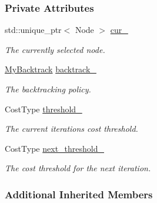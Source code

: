 \subsubsection*{Private Attributes}
\begin{DoxyCompactItemize}
\item 
std\+::unique\+\_\+ptr$<$ Node $>$ \hyperlink{structIdAstar_a31b0b5e1d6cd55096a2039ab572c8f8a}{cur\+\_\+}\hypertarget{structIdAstar_a31b0b5e1d6cd55096a2039ab572c8f8a}{}\label{structIdAstar_a31b0b5e1d6cd55096a2039ab572c8f8a}

\begin{DoxyCompactList}\small\item\em The currently selected node. \end{DoxyCompactList}\item 
\hyperlink{structIdAstar_a94823ee534c98478b29969d1a7f1c859}{My\+Backtrack} \hyperlink{structIdAstar_a51fc74d792b6e168dba6cbff3290dff5}{backtrack\+\_\+}\hypertarget{structIdAstar_a51fc74d792b6e168dba6cbff3290dff5}{}\label{structIdAstar_a51fc74d792b6e168dba6cbff3290dff5}

\begin{DoxyCompactList}\small\item\em The backtracking policy. \end{DoxyCompactList}\item 
Cost\+Type \hyperlink{structIdAstar_a85df1b8a75ed2212e59f8f939299a3c5}{threshold\+\_\+}\hypertarget{structIdAstar_a85df1b8a75ed2212e59f8f939299a3c5}{}\label{structIdAstar_a85df1b8a75ed2212e59f8f939299a3c5}

\begin{DoxyCompactList}\small\item\em The current iteration\textquotesingle{}s cost threshold. \end{DoxyCompactList}\item 
Cost\+Type \hyperlink{structIdAstar_a89a03e4cab750c5547dc46e9c944c5bd}{next\+\_\+threshold\+\_\+}\hypertarget{structIdAstar_a89a03e4cab750c5547dc46e9c944c5bd}{}\label{structIdAstar_a89a03e4cab750c5547dc46e9c944c5bd}

\begin{DoxyCompactList}\small\item\em The cost threshold for the next iteration. \end{DoxyCompactList}\end{DoxyCompactItemize}
\subsubsection*{Additional Inherited Members}


